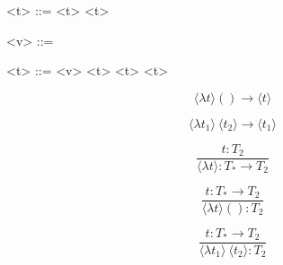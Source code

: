 \documentclass[11hpt]{article}
\begin{document}
\begin{grammar}
<\lambda t> ::= \lit{() ->} <t>
  \alt \lit{->} <t>

<v> ::= 
  \alt {}

<t> ::= <v>
  \alt <\lambda t>\lit{()}
  \alt <\lambda t> <t>

\end{grammar}


\begin{equation}
\langle\lambda t\rangle() \to \langle t \rangle
\end{equation}

\begin{equation}
\langle\lambda t_{1}\rangle \ \langle t_{2} \rangle \to \langle t_{1} \rangle
\end{equation}

\begin{equation}
\frac{t : T_{2}}{\langle\lambda t\rangle : T_{*} \to T_{2}}
\end{equation}

\begin{equation}
\frac{t : T_{*} \to T_{2}}{\langle\lambda t\rangle() : T_{2}}
\end{equation}

\begin{equation}
\frac{t : T_{*} \to T_{2}}{\langle\lambda t_{1}\rangle \ \langle t_{2} \rangle : T_{2}}
\end{equation}
\end{document}
